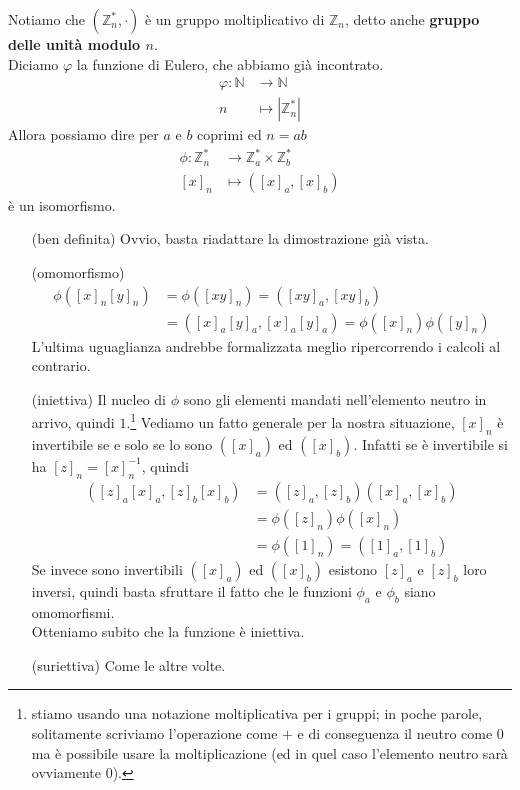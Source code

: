\begin{osservazione}
	Notiamo che $\left(\mathbb{Z}_n^*,\cdot\right)$ è un gruppo moltiplicativo di $\mathbb{Z}_n$, detto anche \textbf{gruppo delle unità modulo $n$}. \\ Diciamo $\varphi$ la funzione di Eulero, che abbiamo già incontrato.
	\begin{align*}
	\varphi: \mathbb{N}&\longrightarrow \mathbb{N}\\
	n &\longmapsto |\mathbb{Z}_n^*|
	\end{align*}
	Allora possiamo dire per $a$ e $b$ coprimi ed $n=ab$
	\begin{align*}
	\phi:\mathbb{Z}^*_n&\longrightarrow\mathbb{Z}^*_a\times \mathbb{Z}^*_b\\
	[x]_n&\longmapsto\left([x]_a,[x]_b\right)
	\end{align*}
	è un isomorfismo.
	\begin{itemize}
		\item[(ben definita)] Ovvio, basta riadattare la dimostrazione già vista.
		\item[(omomorfismo)] 
		\begin{align*}
		\phi\left([x]_n[y]_n\right)&=\phi\left([xy]_n\right)=\left([xy]_a,[xy]_b\right)\\
		&=\left([x]_a[y]_a,[x]_a[y]_a\right)=\phi\left([x]_n\right)\phi\left([y]_n\right)
		\end{align*}
		L'ultima uguaglianza andrebbe formalizzata meglio ripercorrendo i calcoli al contrario. \\
		\item[(iniettiva)] Il nucleo di $\phi$ sono gli elementi mandati nell'elemento neutro in arrivo, quindi $1$.\footnote{stiamo usando una notazione moltiplicativa per i gruppi; in poche parole, solitamente scriviamo l'operazione come $+$ e di conseguenza il neutro come $0$ ma è possibile usare la moltiplicazione (ed in quel caso l'elemento neutro sarà ovviamente 0).}
		Vediamo un fatto generale per la nostra situazione, $[x]_n$ è invertibile se e solo se lo sono $\left([x]_a\right)$ ed $\left([x]_b\right)$. Infatti se è invertibile si ha $[z]_n=[x]^{-1}_n$, quindi
		\begin{align*}
		\left([z]_a[x]_a,[z]_b[x]_b\right)&=\left([z]_a,[z]_b\right)\left([x]_a,[x]_b\right)\\
		&=\phi([z]_n)\phi([x]_n)\\
		&=\phi([1]_n)=\left([1]_a,[1]_b\right)
		\end{align*}
		Se invece sono invertibili $\left([x]_a\right)$ ed $\left([x]_b\right)$ esistono $[z]_a$ e $[z]_b$ loro inversi, quindi basta sfruttare il fatto che le funzioni $\phi_a$ e $\phi_b$ siano omomorfismi. \\ Otteniamo subito che la funzione è iniettiva.
		\item[(suriettiva)] Come le altre volte.
	\end{itemize}
\end{osservazione}
